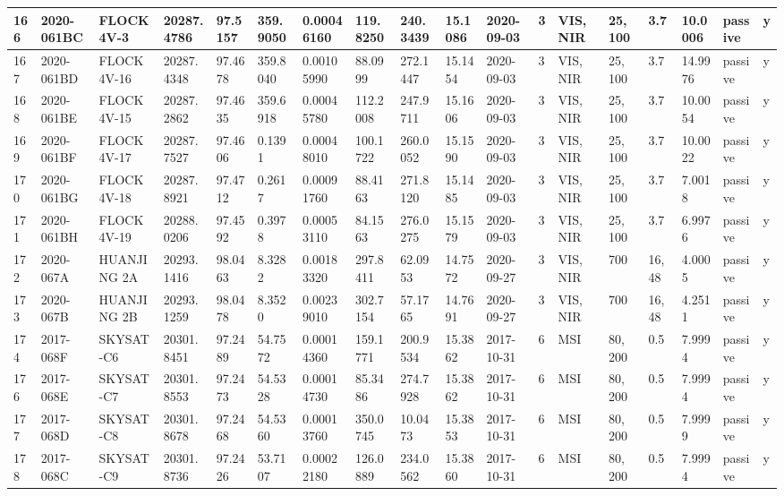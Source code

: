 \documentclass[12pt,a4paper,notitlepage,twoside,openright]{report}
\begin{document}
\begin{longtable}{|l|l|l|l|l|l|l|l|l|l|l|l|l|l|l|l|l|l|}
        166 & 2020-061BC & FLOCK 4V-3 & 20287.4786 & 97.5157 & 359.9050 & 0.00046160 & 119.8250 & 240.3439 & 15.1086 & 2020-09-03 & 3 & VIS, NIR & 25, 100 & 3.7 & 10.0006 & passive & y \\ \hline
        167 & 2020-061BD & FLOCK 4V-16 & 20287.4348 & 97.4678 & 359.8040 & 0.00105990 & 88.0999 & 272.1447 & 15.1454 & 2020-09-03 & 3 & VIS, NIR & 25, 100 & 3.7 & 14.9976 & passive & y \\ \hline
        168 & 2020-061BE & FLOCK 4V-15 & 20287.2862 & 97.4635 & 359.6918 & 0.00045780 & 112.2008 & 247.9711 & 15.1606 & 2020-09-03 & 3 & VIS, NIR & 25, 100 & 3.7 & 10.0054 & passive & y \\ \hline
        169 & 2020-061BF & FLOCK 4V-17 & 20287.7527 & 97.4606 & 0.1391 & 0.00048010 & 100.1722 & 260.0052 & 15.1590 & 2020-09-03 & 3 & VIS, NIR & 25, 100 & 3.7 & 10.0022 & passive & y \\ \hline
        170 & 2020-061BG & FLOCK 4V-18 & 20287.8921 & 97.4712 & 0.2617 & 0.00091760 & 88.4163 & 271.8120 & 15.1485 & 2020-09-03 & 3 & VIS, NIR & 25, 100 & 3.7 & 7.0018 & passive & y \\ \hline
        171 & 2020-061BH & FLOCK 4V-19 & 20288.0206 & 97.4592 & 0.3978 & 0.00053110 & 84.1563 & 276.0275 & 15.1579 & 2020-09-03 & 3 & VIS, NIR & 25, 100 & 3.7 & 6.9976 & passive & y \\ \hline
        172 & 2020-067A & HUANJING 2A & 20293.1416 & 98.0463 & 8.3282 & 0.00183320 & 297.8411 & 62.0953 & 14.7572 & 2020-09-27 & 3 & VIS, NIR & 700 & 16, 48 & 4.0005 & passive & y \\ \hline
        173 & 2020-067B & HUANJING 2B & 20293.1259 & 98.0478 & 8.3520 & 0.00239010 & 302.7154 & 57.1765 & 14.7691 & 2020-09-27 & 3 & VIS, NIR & 700 & 16, 48 & 4.2511 & passive & y \\ \hline
        174 & 2017-068F & SKYSAT-C6 & 20301.8451 & 97.2489 & 54.7572 & 0.00014360 & 159.1771 & 200.9534 & 15.3862 & 2017-10-31 & 6 & MSI & 80, 200 & 0.5 & 7.9994 & passive & y \\ \hline
        176 & 2017-068E & SKYSAT-C7 & 20301.8553 & 97.2473 & 54.5328 & 0.00014730 & 85.3486 & 274.7928 & 15.3862 & 2017-10-31 & 6 & MSI & 80, 200 & 0.5 & 7.9994 & passive & y \\ \hline
        177 & 2017-068D & SKYSAT-C8 & 20301.8678 & 97.2468 & 54.5360 & 0.00013760 & 350.0745 & 10.0473 & 15.3853 & 2017-10-31 & 6 & MSI & 80, 200 & 0.5 & 7.9999 & passive & y \\ \hline
        178 & 2017-068C & SKYSAT-C9 & 20301.8736 & 97.2426 & 53.7107 & 0.00022180 & 126.0889 & 234.0562 & 15.3860 & 2017-10-31 & 6 & MSI & 80, 200 & 0.5 & 7.9994 & passive & y \\ \hline

\end{longtable}
\end{document}
